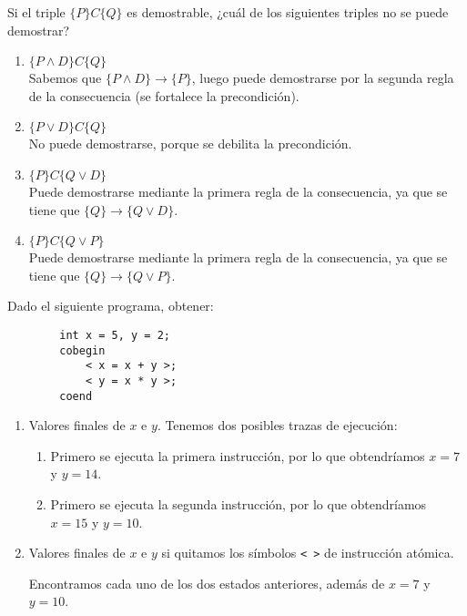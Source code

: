 \begin{ejercicio}
    Si el triple $\{P\} C \{Q\}$ es demostrable, ¿cuál de los siguientes triples no se puede demostrar?
    \begin{enumerate}
        \item $\{P \land D\} C \{Q\}$\\
            Sabemos que $\{P \land D\}\rightarrow\{P\}$, luego puede demostrarse por la segunda regla de la consecuencia (se fortalece la precondición).
        \item $\{P \lor D\} C \{Q\}$\\
            No puede demostrarse, porque se debilita la precondición.
        \item $\{P\} C \{Q \lor D\}$\\
            Puede demostrarse mediante la primera regla de la consecuencia, ya que se tiene que ${\{Q\}\rightarrow\{Q \lor D\}}$.

        \item $\{P\} C \{Q \lor P\}$\\
        Puede demostrarse mediante la primera regla de la consecuencia, ya que se tiene que ${\{Q\}\rightarrow\{Q \lor P\}}$.
    \end{enumerate}
\end{ejercicio}

\begin{ejercicio}
    Dado el siguiente programa, obtener:
    \begin{verbatim}
        int x = 5, y = 2;
        cobegin
            < x = x + y >;
            < y = x * y >;
        coend
    \end{verbatim}
    \begin{enumerate}
        \item Valores finales de $x$ e $y$.
        Tenemos dos posibles trazas de ejecución:
        \begin{enumerate}
            \item Primero se ejecuta la primera instrucción, por lo que obtendríamos $x = 7$ y $y = 14$.
            \item Primero se ejecuta la segunda instrucción, por lo que obtendríamos $x = 15$ y $y = 10$.
        \end{enumerate}
        \item Valores finales de $x$ e $y$ si quitamos los símbolos \verb|< >| de instrucción atómica.
        
        Encontramos cada uno de los dos estados anteriores, además de $x = 7$ y $y= 10$.
    \end{enumerate}
\end{ejercicio}

